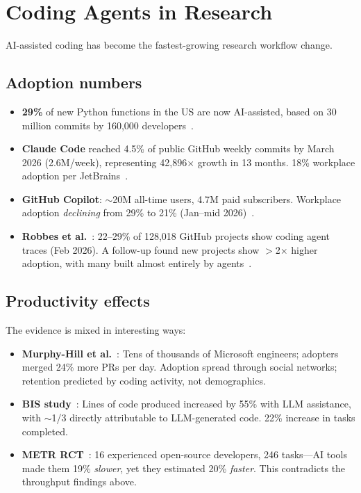 \documentclass[11pt,a4paper]{article}
\begin{document}
\section{Coding Agents in Research}
\label{sec:coding}

AI-assisted coding has become the fastest-growing research workflow change.

\subsection{Adoption numbers}

\begin{itemize}
\item \textbf{29\%} of new Python functions in the US are now AI-assisted, based on 30 million commits by 160,000 developers~\cite{daniotti2026}.
\item \textbf{Claude Code} reached 4.5\% of public GitHub weekly commits by March 2026 (2.6M/week), representing 42,896$\times$ growth in 13 months. 18\% workplace adoption per JetBrains~\cite{jetbrains2026}.
\item \textbf{GitHub Copilot}: $\sim$20M all-time users, 4.7M paid subscribers. Workplace adoption \emph{declining} from 29\% to 21\% (Jan--mid 2026)~\cite{jetbrains2026}.
\item \textbf{Robbes et al.}~\cite{robbes2026}: 22--29\% of 128,018 GitHub projects show coding agent traces (Feb 2026). A follow-up found new projects show $>$2$\times$ higher adoption, with many built almost entirely by agents~\cite{robbes2026b}.
\end{itemize}

\subsection{Productivity effects}

The evidence is mixed in interesting ways:

\begin{itemize}
\item \textbf{Murphy-Hill et al.}~\cite{murphyhill2026}: Tens of thousands of Microsoft engineers; adopters merged 24\% more PRs per day. Adoption spread through social networks; retention predicted by coding activity, not demographics.
\item \textbf{BIS study}~\cite{bis2025}: Lines of code produced increased by 55\% with LLM assistance, with $\sim$1/3 directly attributable to LLM-generated code. 22\% increase in tasks completed.
\item \textbf{METR RCT}~\cite{metr2025}: 16 experienced open-source developers, 246 tasks---AI tools made them 19\% \emph{slower}, yet they estimated 20\% \emph{faster}. This contradicts the throughput findings above.
\end{itemize}
\end{document}
